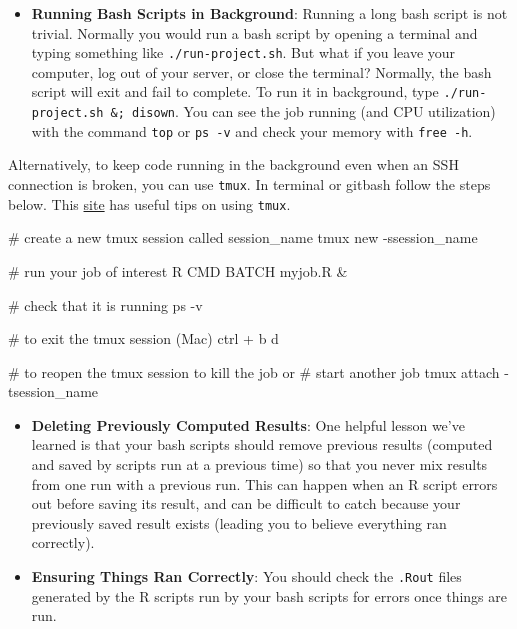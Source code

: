 \documentclass[
]{book}
\newenvironment{Shaded}{\begin{snugshade}}{\end{snugshade}}
\newcommand{\NormalTok}[1]{#1}
\providecommand{\tightlist}{%
  \setlength{\itemsep}{0pt}\setlength{\parskip}{0pt}}
\begin{document}
\begin{itemize}
\tightlist
\item
  \textbf{Running Bash Scripts in Background}: Running a long bash script is not trivial. Normally you would run a bash script by opening a terminal and typing something like \texttt{./run-project.sh}. But what if you leave your computer, log out of your server, or close the terminal? Normally, the bash script will exit and fail to complete. To run it in background, type \texttt{./run-project.sh\ \&;\ disown}. You can see the job running (and CPU utilization) with the command \texttt{top} or \texttt{ps\ -v} and check your memory with \texttt{free\ -h}.
\end{itemize}

Alternatively, to keep code running in the background even when an SSH connection is broken, you can use \texttt{tmux}. In terminal or gitbash follow the steps below. This \href{https://medium.com/@jeongwhanchoi/install-tmux-on-osx-and-basics-commands-for-beginners-be22520fd95e}{site} has useful tips on using \texttt{tmux}.

\begin{Shaded}
\begin{Highlighting}[]
\NormalTok{\# create a new tmux session called session\_name}
\NormalTok{tmux new {-}ssession\_name}

\NormalTok{\# run your job of interest}
\NormalTok{R CMD BATCH myjob.R \& }
  
\NormalTok{\# check that it is running}
\NormalTok{ps {-}v}

\NormalTok{\# to exit the tmux session (Mac)}
\NormalTok{ctrl + b }
\NormalTok{d}

\NormalTok{\# to reopen the tmux session to kill the job or }
\NormalTok{\# start another job}
\NormalTok{tmux attach {-}tsession\_name }
\end{Highlighting}
\end{Shaded}

\begin{itemize}
\item
  \textbf{Deleting Previously Computed Results}: One helpful lesson we've learned is that your bash scripts should remove previous results (computed and saved by scripts run at a previous time) so that you never mix results from one run with a previous run. This can happen when an R script errors out before saving its result, and can be difficult to catch because your previously saved result exists (leading you to believe everything ran correctly).
\item
  \textbf{Ensuring Things Ran Correctly}: You should check the \texttt{.Rout} files generated by the R scripts run by your bash scripts for errors once things are run.
\end{itemize}
\end{document}
